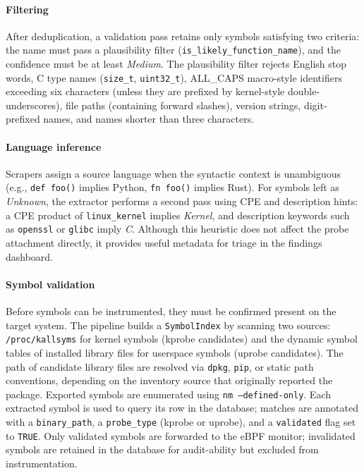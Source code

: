 \documentclass[conference]{IEEEtran}
\begin{document}
\paragraph{Filtering}
After deduplication, a validation pass retains only symbols satisfying two criteria: the name must pass a plausibility filter (\texttt{is\_likely\_function\_name}), and the confidence must be at least \textit{Medium}.
The plausibility filter rejects English stop words, C type names (\texttt{size\_t}, \texttt{uint32\_t}), ALL\_CAPS macro-style identifiers exceeding six characters (unless they are prefixed by kernel-style double-underscores), file paths (containing forward slashes), version strings, digit-prefixed names, and names shorter than three characters.

\paragraph{Language inference}
Scrapers assign a source language when the syntactic context is unambiguous (e.g., \texttt{def foo()} implies Python, \texttt{fn foo()} implies Rust).
For symbols left as \textit{Unknown}, the extractor performs a second pass using CPE and description hints: a CPE product of \texttt{linux\_kernel} implies \textit{Kernel}, and description keywords such as \texttt{openssl} or \texttt{glibc} imply \textit{C}.
Although this heuristic does not affect the probe attachment directly, it provides useful metadata for triage in the findings dashboard.

\paragraph{Symbol validation}
Before symbols can be instrumented, they must be confirmed present on the target system.
The pipeline builds a \texttt{SymbolIndex} by scanning two sources: \texttt{/proc/kallsyms} for kernel symbols (kprobe candidates) and the dynamic symbol tables of installed library files for userspace symbols (uprobe candidates).
The path of candidate library files are resolved via \texttt{dpkg}, \texttt{pip}, or static path conventions, depending on the inventory source that originally reported the package.
Exported symbols are enumerated using \texttt{nm~--defined-only}.
Each extracted symbol is used to query its row in the database; matches are annotated with a \texttt{binary\_path}, a \texttt{probe\_type} (kprobe or uprobe), and a \texttt{validated} flag set to \texttt{TRUE}.
Only validated symbols are forwarded to the eBPF monitor; invalidated symbols are retained in the database for audit-ability but excluded from instrumentation.
\end{document}
